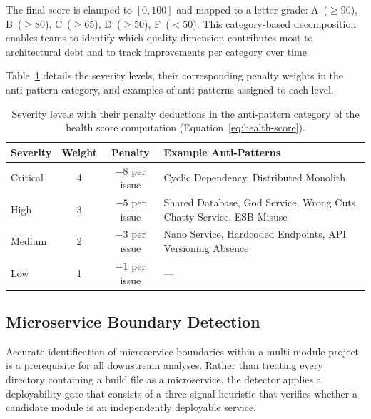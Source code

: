 \par The final score is clamped to $[0, 100]$ and mapped to a letter grade: A~($\geq 90$), B~($\geq 80$), C~($\geq 65$), D~($\geq 50$), F~($< 50$). This category-based decomposition enables teams to identify which quality dimension contributes most to architectural debt and to track improvements per category over time.

Table~\ref{tab:severity-weights} details the severity levels, their corresponding penalty weights in the anti-pattern category, and examples of anti-patterns assigned to each level.

\begin{table}[htbp]
    \centering
    \footnotesize
    \begin{tabular}{|l|c|c|p{6.5cm}|}
        \hline
        \textbf{Severity} & \textbf{Weight} & \textbf{Penalty} & \textbf{Example Anti-Patterns} \\
        \hline\hline
        Critical & 4 & $-8$ per issue & Cyclic Dependency, Distributed Monolith \\
        \hline
        High & 3 & $-5$ per issue & Shared Database, God Service, Wrong Cuts, Chatty Service, ESB Misuse \\
        \hline
        Medium & 2 & $-3$ per issue & Nano Service, Hardcoded Endpoints, API Versioning Absence \\
        \hline
        Low & 1 & $-1$ per issue & --- \\
        \hline
    \end{tabular}
    \caption{Severity levels with their penalty deductions in the anti-pattern category of the health score computation (Equation~\ref{eq:health-score}).}
    \label{tab:severity-weights}
\end{table}

\subsection{Microservice Boundary Detection}
\label{subsec:microservice-detection}

\par Accurate identification of microservice boundaries within a multi-module project is a prerequisite for all downstream analyses. Rather than treating every directory containing a build file as a microservice, the detector applies a deployability gate that consists of a three-signal heuristic that verifies whether a candidate module is an independently deployable service.


